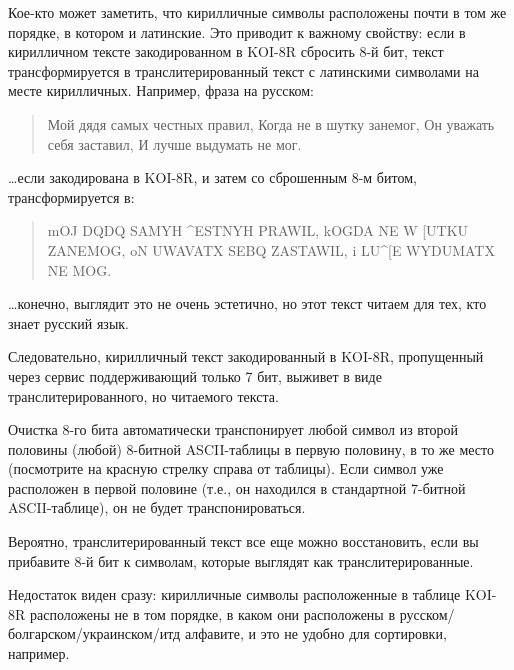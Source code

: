 Кое-кто может заметить, что кирилличные символы расположены почти в том же порядке, в котором и латинские.
Это приводит к важному свойству: если в кирилличном тексте закодированном в KOI-8R сбросить 8-й бит,
текст трансформируется в транслитерированный текст с латинскими символами на месте кирилличных.
Например, фраза на русском:

\begin{framed}
\begin{quotation}
Мой дядя самых честных правил, Когда не в шутку занемог, Он уважать себя заставил, И лучше выдумать не мог.
\end{quotation}
\end{framed}

\dots если закодирована в KOI-8R, и затем со сброшенным 8-м битом, трансформируется в:

\begin{framed}
\begin{quotation}
mOJ DQDQ SAMYH \^{}ESTNYH PRAWIL, kOGDA NE W [UTKU ZANEMOG, oN UWAVATX SEBQ ZASTAWIL, i LU\^{}[E WYDUMATX NE MOG.
\end{quotation}
\end{framed}

\dots конечно, выглядит это не очень эстетично, но этот текст читаем для тех, кто знает русский язык.

Следовательно, кирилличный текст закодированный в KOI-8R, пропущенный через сервис поддерживающий только 7 бит,
выживет в виде транслитерированного, но читаемого текста.

Очистка 8-го бита автоматически транспонирует любой символ из второй половины (любой) 8-битной \ac{ASCII}-таблицы
в первую половину, в то же место (посмотрите на красную стрелку справа от таблицы).
Если символ уже расположен в первой половине (т.е., он находился в стандартной 7-битной \ac{ASCII}-таблице),
он не будет транспонироваться.

Вероятно, транслитерированный текст все еще можно восстановить, если вы прибавите 8-й бит к символам,
которые выглядят как транслитерированные.

Недостаток виден сразу: кирилличные символы расположенные в таблице KOI-8R расположены не в том порядке,
в каком они расположены в русском/болгарском/украинском/итд алфавите, и это не удобно для сортировки, например.


